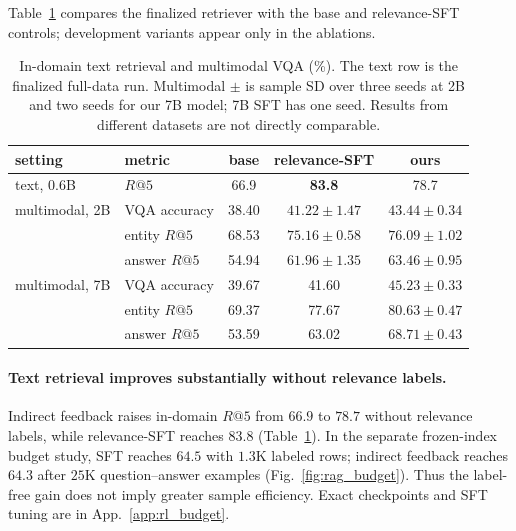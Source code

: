 Table~\ref{tab:mm_main} compares the finalized retriever with the base and relevance-SFT controls;
development variants appear only in the ablations.

\begin{table}[H]
\centering\small
\caption{In-domain text retrieval and multimodal VQA (\%). The text row is the finalized full-data
run. Multimodal $\pm$ is sample SD over three seeds at 2B and two seeds for our 7B model; 7B SFT
has one seed. Results from different datasets are not directly comparable.}
\label{tab:mm_main}
\begin{tabular}{llccc}
\toprule
setting & metric & base & relevance-SFT & ours \\
\midrule
text, 0.6B & $R@5$ & 66.9 & \textbf{83.8} & 78.7 \\
\midrule
multimodal, 2B & VQA accuracy & 38.40 & $41.22 \pm 1.47$ & $\mathbf{43.44 \pm 0.34}$ \\
               & entity $R@5$ & 68.53 & $75.16 \pm 0.58$ & $\mathbf{76.09 \pm 1.02}$ \\
               & answer $R@5$ & 54.94 & $61.96 \pm 1.35$ & $\mathbf{63.46 \pm 0.95}$ \\
\midrule
multimodal, 7B & VQA accuracy & 39.67 & 41.60 & $\mathbf{45.23 \pm 0.33}$ \\
               & entity $R@5$ & 69.37 & 77.67 & $\mathbf{80.63 \pm 0.47}$ \\
               & answer $R@5$ & 53.59 & 63.02 & $\mathbf{68.71 \pm 0.43}$ \\
\bottomrule
\end{tabular}
\end{table}

\clearpage


\paragraph{Text retrieval improves substantially without relevance labels.}
Indirect feedback raises in-domain $R@5$ from $66.9$ to $78.7$ without relevance labels, while
relevance-SFT reaches $83.8$ (Table~\ref{tab:mm_main}). In the separate frozen-index budget study,
SFT reaches $64.5$ with $1.3$K labeled rows; indirect feedback reaches $64.3$ after $25$K
question--answer examples (Fig.~\ref{fig:rag_budget}). Thus the label-free gain does not imply
greater sample efficiency. Exact checkpoints and SFT tuning are in App.~\ref{app:rl_budget}.

